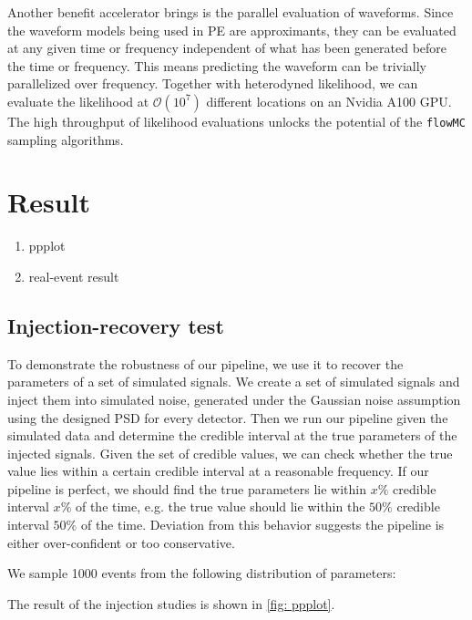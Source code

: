 \documentclass[twocolumn]{aastex631}
\begin{document}
Another benefit accelerator brings is the parallel evaluation of waveforms. Since
the waveform models being used in PE are approximants, they can be evaluated at
any given time or frequency independent of what has been generated before the
time or frequency. This means predicting the waveform can be trivially
parallelized over frequency. Together with heterodyned likelihood, we can
evaluate the likelihood at $\mathcal{O}(10^7)$ different locations on an Nvidia
A100 GPU. The high throughput of likelihood evaluations unlocks the potential of
the \texttt{flowMC} sampling algorithms.

\section{Result}
\label{sec: Result}

\begin{enumerate}
    \item ppplot
    \item real-event result
\end{enumerate}

\subsection{Injection-recovery test}

To demonstrate the robustness of our pipeline, we use it to recover the
parameters of a set of simulated signals. We create a set of simulated signals
and inject them into simulated noise, generated under the Gaussian noise
assumption using the designed PSD for every detector. Then we run our pipeline
given the simulated data and determine the credible interval at the true
parameters of the injected signals. Given the set of credible values, we can
check whether the true value lies within a certain credible interval at a
reasonable frequency. If our pipeline is perfect, we should find the true
parameters lie within $x\%$ credible interval $x\%$ of the time, e.g. the true
value should lie within the $50\%$ credible interval $50\%$ of the time.
Deviation from this behavior suggests the pipeline is either over-confident or
too conservative.

We sample 1000 events from the following distribution of parameters:


The result of the injection studies is shown in \ref{fig: ppplot}.
\end{document}
